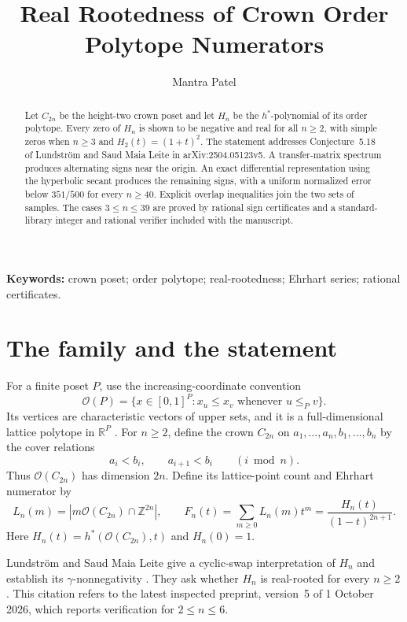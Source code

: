 \documentclass[11pt,letterpaper]{article}
\title{Real Rootedness of Crown Order Polytope Numerators}
\author{Mantra Patel}
\date{}
\numberwithin{equation}{section}
\newcommand{\OO}{\mathcal O}
\begin{document}
\maketitle
\begin{abstract}
Let $C_{2n}$ be the height-two crown poset and let $H_n$ be the $h^*$-polynomial of its order polytope. Every zero of $H_n$ is shown to be negative and real for all $n\ge2$, with simple zeros when $n\ge3$ and $H_2(t)=(1+t)^2$. The statement addresses Conjecture~5.18 of Lundstr\"om and Saud Maia Leite in arXiv:2504.05123v5. A transfer-matrix spectrum produces alternating signs near the origin. An exact differential representation using the hyperbolic secant produces the remaining signs, with a uniform normalized error below $351/500$ for every $n\ge40$. Explicit overlap inequalities join the two sets of samples. The cases $3\le n\le39$ are proved by rational sign certificates and a standard-library integer and rational verifier included with the manuscript.
\end{abstract}
\noindent\textbf{Keywords:} crown poset; order polytope; real-rootedness; Ehrhart series; rational certificates.


\section{The family and the statement}
For a finite poset $P$, use the increasing-coordinate convention
\[
 \OO(P)=\{x\in[0,1]^P:x_u\le x_v\text{ whenever }u\le_Pv\}.
\]
Its vertices are characteristic vectors of upper sets, and it is a full-dimensional lattice polytope in $\mathbb R^P$ \cite{Stanley}. For $n\ge2$, define the crown $C_{2n}$ on $a_1,\ldots,a_n,b_1,\ldots,b_n$ by the cover relations
\[
 a_i<b_i,\qquad a_{i+1}<b_i\qquad (i\bmod n).
\]
Thus $\OO(C_{2n})$ has dimension $2n$. Define its lattice-point count and Ehrhart numerator by
\begin{equation}\label{eq:definition}
 L_n(m)=|m\OO(C_{2n})\cap\mathbb Z^{2n}|,
 \qquad F_n(t)=\sum_{m\ge0}L_n(m)t^m=\frac{H_n(t)}{(1-t)^{2n+1}}.
\end{equation}
Here $H_n(t)=h^*(\OO(C_{2n}),t)$ and $H_n(0)=1$.

Lundstr\"om and Saud Maia Leite give a cyclic-swap interpretation of $H_n$ and establish its $\gamma$-nonnegativity \cite[Theorems~5.11 and~5.19]{LSML}. They ask whether $H_n$ is real-rooted for every $n\ge2$ \cite[Conjecture~5.18, p.~30]{LSML}. This citation refers to the latest inspected preprint, version~5 of 1 October 2026, which reports verification for $2\le n\le6$.
\end{document}
